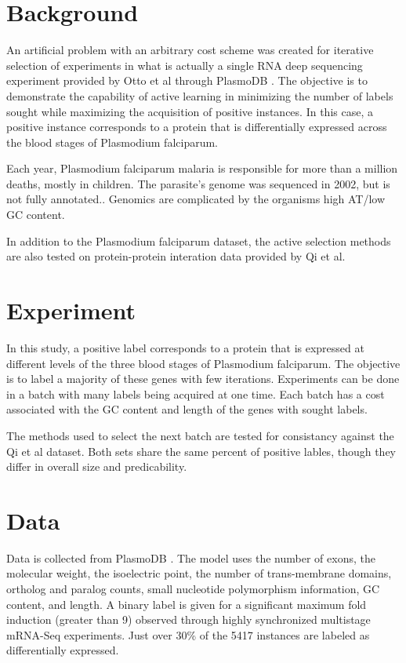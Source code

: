 \documentclass[10pt,a4pape r]{article}
\begin{document}
\begin{center}\Large \bfseries \PSName \end{center}


\section{Background}
An artificial problem with an arbitrary cost scheme was created for iterative selection of experiments in what is actually a single RNA deep sequencing experiment provided by Otto et al \cite{llinas} through PlasmoDB \cite{plasmodb}.  The objective is to demonstrate the capability of active learning in minimizing the number of labels sought while maximizing the acquisition of positive instances. In this case, a positive instance corresponds to a protein that is differentially expressed across the blood stages of Plasmodium falciparum.

Each year, Plasmodium falciparum malaria is responsible for more than a million deaths, mostly in children. The parasite's genome was sequenced in 2002, but is not fully annotated.\cite{llinas}. Genomics are complicated by the organisms high AT/low GC content. 

In addition to the Plasmodium falciparum dataset, the active selection methods are also tested on protein-protein interation data provided by Qi et al\cite{qi}.

\section{Experiment}
In this study, a positive label corresponds to a protein that is expressed at different levels of the three blood stages of Plasmodium falciparum. The objective is to label a majority of these genes with few iterations. Experiments can be done in a batch with many labels being acquired at one time.  Each batch has a cost associated with the GC content and length of the genes with sought labels. 

The methods used to select the next batch are tested for consistancy against the Qi et al dataset. Both sets share the same percent of positive lables, though they differ in overall size and predicability.

\section{Data}
Data is collected from PlasmoDB \cite{plasmodb}. The model uses the number of exons, the molecular weight, the isoelectric point, the number of trans-membrane domains, ortholog and paralog counts, small nucleotide polymorphism information, GC content, and length. A binary label is given for a significant maximum fold induction (greater than 9) observed through highly synchronized multistage  mRNA-Seq experiments\cite{llinas}. Just over 30\% of the 5417 instances are labeled as differentially expressed.
\end{document}
